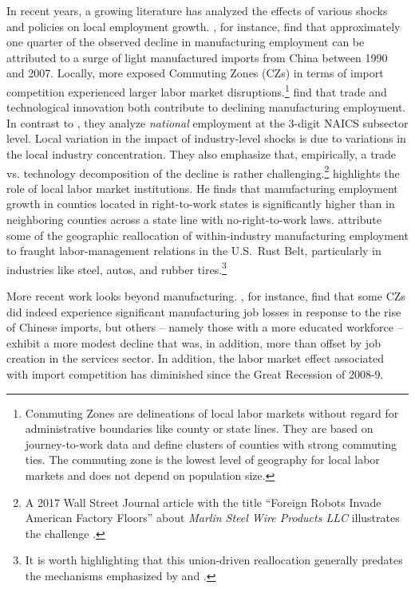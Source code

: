 \documentclass[onehalfspacing,11pt]{article}
\begin{document}
In recent years, a growing literature has analyzed the effects of various shocks and policies on local employment growth. \cite{Autor:2013}, for instance, find that approximately one quarter of the observed decline in manufacturing employment can be attributed to a surge of light manufactured imports from China between 1990 and 2007. Locally, more exposed Commuting Zones (CZs) in terms of import competition experienced larger labor market disruptions.\footnote{Commuting Zones are delineations of local labor markets without regard for administrative boundaries like county or state lines. They are based on journey-to-work data and define clusters of counties with strong commuting ties. The commuting zone is the lowest level of geography for local labor markets and does not depend on population size.} \cite{Fort:2018} find that trade and technological innovation both contribute to declining manufacturing employment. In contrast to \cite{Autor:2013}, they analyze {\it national} employment at the 3-digit NAICS subsector level. Local variation in the impact of industry-level shocks is due to variations in the local industry concentration. They also emphasize that, empirically, a trade vs. technology decomposition of the decline is rather challenging.\footnote{A 2017 Wall Street Journal article with the title ``Foreign Robots Invade American Factory Floors'' about {\it Marlin Steel Wire Products LLC} illustrates the challenge \citep{Michaels:2017}.} \cite{Holmes:1998} highlights the role of local labor market institutions. He finds that manufacturing employment growth in counties located in right-to-work states is significantly higher than in neighboring counties across a state line with no-right-to-work laws. \cite{Alder:2019b} attribute some of the geographic reallocation of within-industry manufacturing employment to fraught labor-management relations in the U.S.~Rust Belt, particularly in industries like steel, autos, and rubber tires.\footnote{It is worth highlighting that this union-driven reallocation generally predates the mechanisms emphasized by \cite{Autor:2013} and \cite{Fort:2018}.}

More recent work looks beyond manufacturing. \cite{Bloom:2019}, for instance, find that some CZs did indeed experience significant manufacturing job losses in response to the rise of Chinese imports, but others -- namely those with a more educated workforce -- exhibit a more modest decline that was, in addition, more than offset by job creation in the services sector. In addition, the labor market effect associated with import competition has diminished since the Great Recession of 2008-9.
\end{document}
